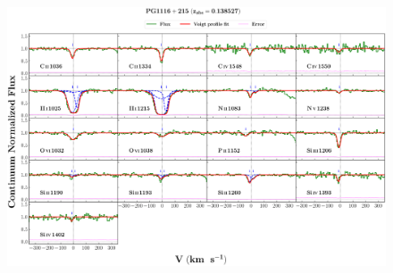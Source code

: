 \documentclass[12pt,draft]{report}
\begin{document}
\begin{landscape}

\begin{figure}
    \centering
    \vspace{-20mm}
    \hspace*{-35mm}
    \includegraphics[width=1.25\linewidth]{System-Plots/PG1116+215_z=0.138527_sys_plot.png}
\end{figure}

\end{landscape}
\end{document}
